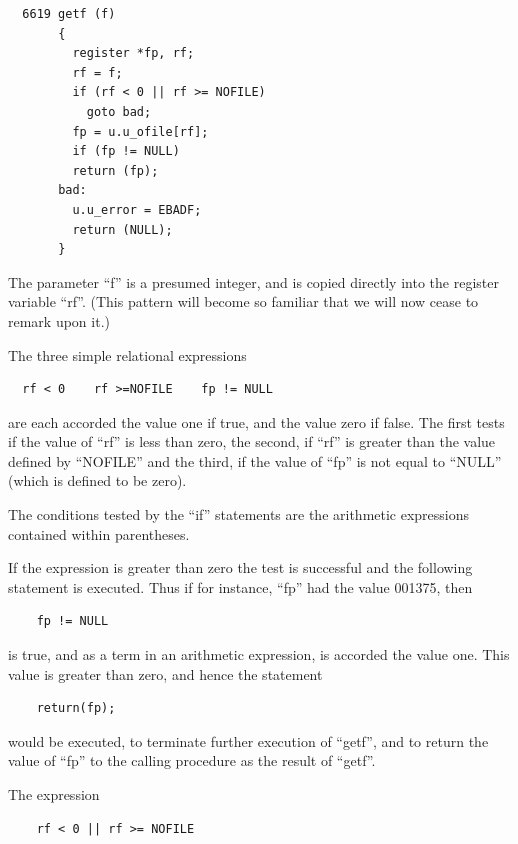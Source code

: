 
\begin{verbatim}
  6619 getf (f)
       {
         register *fp, rf;
         rf = f;
         if (rf < 0 || rf >= NOFILE)
           goto bad;
         fp = u.u_ofile[rf];
         if (fp != NULL)
         return (fp);
       bad:
         u.u_error = EBADF;
         return (NULL);
       }
\end{verbatim}

The parameter ``f'' is a presumed
integer, and is copied directly into
the register variable ``rf''. (This pattern will become so familiar that we
will now cease to remark upon it.)

\noindent The three simple relational expressions

\begin{verbatim}
  rf < 0    rf >=NOFILE    fp != NULL
\end{verbatim}

\noindent are each accorded the value one if
true, and the value zero if false. The
first tests if the value of ``rf'' is
less than zero, the second, if ``rf'' is
greater than the value defined by
``NOFILE'' and the third, if the value of
``fp'' is not equal to ``NULL'' (which is
defined to be zero).

The conditions tested by the ``if''
statements are the arithmetic expressions contained within parentheses.

If the expression is greater than zero
the test is successful and the following statement is executed. Thus if for
instance, ``fp'' had the value 001375,
then

\begin{verbatim}
    fp != NULL
\end{verbatim}

\noindent is true, and as a term in an arithmetic
expression, is accorded the value one.
This value is greater than zero, and
hence the statement

\begin{verbatim}
    return(fp);
\end{verbatim}

\noindent would be executed, to terminate further
execution of ``getf'', and to return the
value of ``fp'' to the calling procedure
as the result of ``getf''.


The expression

\begin{verbatim}
    rf < 0 || rf >= NOFILE
\end{verbatim}


